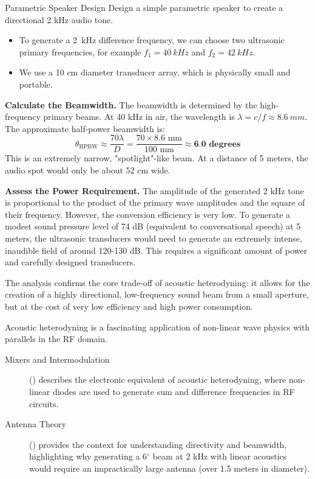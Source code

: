 \begin{workedexample}{Parametric Speaker Design}
     Design a simple parametric speaker to create a directional 2 kHz audio tone.
    \begin{itemize}
        \item To generate a \qty{2}{kHz} difference frequency, we can choose two ultrasonic primary frequencies, for example $f_1 = \qty{40}{kHz}$ and $f_2 = \qty{42}{kHz}$.
        \item We use a 10 cm diameter transducer array, which is physically small and portable.
    \end{itemize}
    \begin{derivationsteps}
        \step \textbf{Calculate the Beamwidth.} The beamwidth is determined by the high-frequency primary beams. At 40 kHz in air, the wavelength is $\lambda = c/f \approx \qty{8.6}{mm}$. The approximate half-power beamwidth is:
        \[ \theta_{\text{HPBW}} \approx \frac{70 \lambda}{D} = \frac{70 \times 8.6 \text{ mm}}{100 \text{ mm}} \approx \textbf{6.0 degrees} \]
        This is an extremely narrow, "spotlight"-like beam. At a distance of 5 meters, the audio spot would only be about 52 cm wide.
        
        \step \textbf{Assess the Power Requirement.} The amplitude of the generated 2 kHz tone is proportional to the product of the primary wave amplitudes and the square of their frequency. However, the conversion efficiency is very low. To generate a modest sound pressure level of 74 dB (equivalent to conversational speech) at 5 meters, the ultrasonic transducers would need to generate an extremely intense, inaudible field of around 120-130 dB. This requires a significant amount of power and carefully designed transducers.
    \end{derivationsteps}
     The analysis confirms the core trade-off of acoustic heterodyning: it allows for the creation of a highly directional, low-frequency sound beam from a small aperture, but at the cost of very low efficiency and high power consumption.
\end{workedexample}


\begin{importantbox}[title={Further Reading}]
    Acoustic heterodyning is a fascinating application of non-linear wave physics with parallels in the RF domain.
    \begin{description}
        \item[Mixers and Intermodulation] () describes the electronic equivalent of acoustic heterodyning, where non-linear diodes are used to generate sum and difference frequencies in RF circuits.
        \item[Antenna Theory] () provides the context for understanding directivity and beamwidth, highlighting why generating a 6$^\circ$ beam at 2 kHz with linear acoustics would require an impractically large antenna (over 1.5 meters in diameter).
    \end{description}
\end{importantbox}
